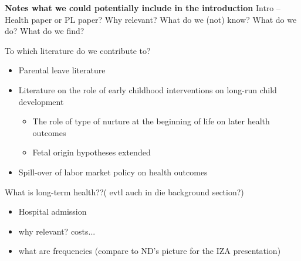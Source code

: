 \documentclass[11pt, a4paper]{article} %
\begin{document}
\newpage
\textbf{Notes what we could potentially include in the introduction}\newline
Intro –
Health paper or PL paper?
Why relevant?
What do we (not) know?
What do we do?
What do we find?

To which literature do we contribute to?
\begin{itemize}
	\item Parental leave literature
	\item Literature on the role of early childhood interventions on long-run child development
	\begin{itemize}
		\item The role of type of nurture at the beginning of life on later health outcomes
		\item Fetal origin hypotheses extended
	\end{itemize}
	\item Spill-over of labor market policy on health outcomes
\end{itemize}

What is long-term health??( evtl auch in die background section?) 
\begin{itemize}
	\item Hospital admission
	\item why relevant? costs...
	\item what are frequencies (compare to ND's picture for the IZA presentation)
\end{itemize}
\end{document}
